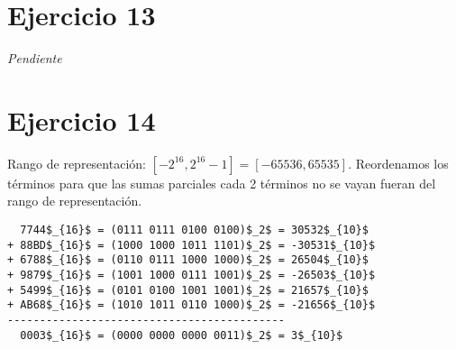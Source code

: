 \section{Ejercicio 13}

\emph{Pendiente}

\section{Ejercicio 14}

Rango de representación: $[-2^{16}, 2^{16} - 1] = [-65536, 65535]$. Reordenamos los términos para que las sumas parciales cada 2 términos no se vayan fueran del rango de representación.

\begin{lstlisting}
  7744$_{16}$ = (0111 0111 0100 0100)$_2$ = 30532$_{10}$
+ 88BD$_{16}$ = (1000 1000 1011 1101)$_2$ = -30531$_{10}$
+ 6788$_{16}$ = (0110 0111 1000 1000)$_2$ = 26504$_{10}$
+ 9879$_{16}$ = (1001 1000 0111 1001)$_2$ = -26503$_{10}$
+ 5499$_{16}$ = (0101 0100 1001 1001)$_2$ = 21657$_{10}$
+ AB68$_{16}$ = (1010 1011 0110 1000)$_2$ = -21656$_{10}$
-------------------------------------------
  0003$_{16}$ = (0000 0000 0000 0011)$_2$ = 3$_{10}$
\end{lstlisting}


